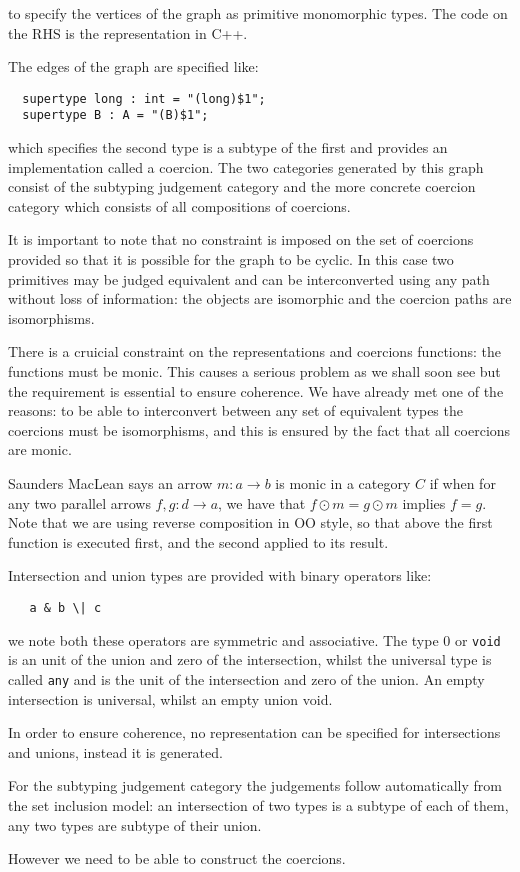 \documentclass[oneside]{book}
\begin{document}
to specify the vertices of the graph as primitive monomorphic types. 
The code on the RHS is the representation in C++.

The edges of the graph are specified like:

\begin{verbatim}
  supertype long : int = "(long)$1";
  supertype B : A = "(B)$1";
\end{verbatim}

which specifies the second type is a subtype of the first and
provides an implementation called a coercion. The two categories generated
by this graph consist of the subtyping judgement category and the more
concrete coercion category which consists of all compositions of 
coercions.

It is important to note that no constraint is imposed on the set of 
coercions provided so that it is possible for the graph to be cyclic.
In this case two primitives may be judged equivalent and can be
interconverted using any path without loss of information: the objects
are isomorphic and the coercion paths are isomorphisms.

There is a cruicial constraint on the representations and coercions
functions: the functions must be monic. This causes a serious problem
as we shall soon see but the requirement is essential to ensure 
coherence. We have already met one of the reasons: to be able to interconvert
between any set of equivalent types the coercions must be isomorphisms,
and this is ensured by the fact that all coercions are monic.

Saunders MacLean says an arrow $m: a\rightarrow b$  is monic in a category $C$
if when for any two parallel arrows $f,g: d\rightarrow a$, we have that $f\odot m = g\odot m$
implies $f=g$. Note that we are using reverse composition in OO style, so that above the first 
function is executed first, and the second applied to its result.

Intersection and union types are provided with binary operators like:

\begin{verbatim}
   a & b \| c
\end{verbatim}

we note both these operators are symmetric and associative.  The type $0$ or {\tt void}
is an unit of the union and zero of the intersection, whilst the universal type is
called {\tt any} and is the unit of the intersection and zero of the union.
An empty intersection is universal, whilst an empty union void.

In order to ensure coherence, no representation can be specified for 
intersections and unions, instead it is generated.

For the subtyping judgement category the judgements follow automatically
from the set inclusion model: an intersection of two types is a subtype
of each of them, any two types are subtype of their union.

However we need to be able to construct the coercions.
\end{document}
